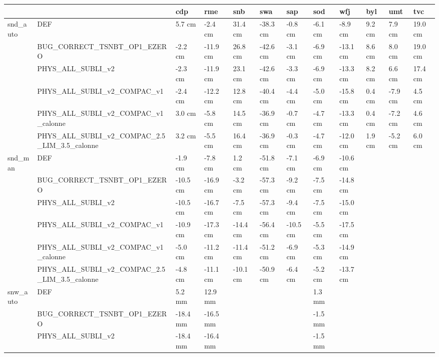 \begin{tabular}{llllllllllll}
\toprule
 &  & cdp & rme & snb & swa & sap & sod & wfj & byl & umt & tvc \\
\midrule
\multirow[t]{6}{*}{snd_auto} & DEF & 5.7 cm & -2.4 cm & 31.4 cm & -38.3 cm & -0.8 cm & -6.1 cm & -8.9 cm & 9.2 cm & 7.9 cm & 19.0 cm \\
 & BUG_CORRECT_TSNBT_OP1_EZERO & -2.2 cm & -11.9 cm & 26.8 cm & -42.6 cm & -3.1 cm & -6.9 cm & -13.1 cm & 8.6 cm & 8.0 cm & 19.0 cm \\
 & PHYS_ALL_SUBLI_v2 & -2.3 cm & -11.9 cm & 23.1 cm & -42.6 cm & -3.3 cm & -6.9 cm & -13.3 cm & 8.2 cm & 6.6 cm & 17.4 cm \\
 & PHYS_ALL_SUBLI_v2_COMPAC_v1 & -2.4 cm & -12.2 cm & 12.8 cm & -40.4 cm & -4.4 cm & -5.0 cm & -15.8 cm & 0.4 cm & -7.9 cm & 4.5 cm \\
 & PHYS_ALL_SUBLI_v2_COMPAC_v1_calonne & 3.0 cm & -5.8 cm & 14.5 cm & -36.9 cm & -0.7 cm & -4.7 cm & -13.3 cm & 0.4 cm & -7.2 cm & 4.6 cm \\
 & PHYS_ALL_SUBLI_v2_COMPAC_2.5_LIM_3.5_calonne & 3.2 cm & -5.5 cm & 16.4 cm & -36.9 cm & -0.3 cm & -4.7 cm & -12.0 cm & 1.9 cm & -5.2 cm & 6.0 cm \\
\cline{1-12}
\multirow[t]{6}{*}{snd_man} & DEF & -1.9 cm & -7.8 cm & 1.2 cm & -51.8 cm & -7.1 cm & -6.9 cm & -10.6 cm &  &  &  \\
 & BUG_CORRECT_TSNBT_OP1_EZERO & -10.5 cm & -16.9 cm & -3.2 cm & -57.3 cm & -9.2 cm & -7.5 cm & -14.8 cm &  &  &  \\
 & PHYS_ALL_SUBLI_v2 & -10.5 cm & -16.7 cm & -7.5 cm & -57.3 cm & -9.4 cm & -7.5 cm & -15.0 cm &  &  &  \\
 & PHYS_ALL_SUBLI_v2_COMPAC_v1 & -10.9 cm & -17.3 cm & -14.4 cm & -56.4 cm & -10.5 cm & -5.5 cm & -17.5 cm &  &  &  \\
 & PHYS_ALL_SUBLI_v2_COMPAC_v1_calonne & -5.0 cm & -11.2 cm & -11.4 cm & -51.2 cm & -6.9 cm & -5.3 cm & -14.9 cm &  &  &  \\
 & PHYS_ALL_SUBLI_v2_COMPAC_2.5_LIM_3.5_calonne & -4.8 cm & -11.1 cm & -10.1 cm & -50.9 cm & -6.4 cm & -5.2 cm & -13.7 cm &  &  &  \\
\cline{1-12}
\multirow[t]{6}{*}{snw_auto} & DEF & 5.2 mm & 12.9 mm &  &  &  & 1.3 mm &  &  &  &  \\
 & BUG_CORRECT_TSNBT_OP1_EZERO & -18.4 mm & -16.5 mm &  &  &  & -1.5 mm &  &  &  &  \\
 & PHYS_ALL_SUBLI_v2 & -18.4 mm & -16.4 mm &  &  &  & -1.5 mm &  &  &  &  \\

\end{tabular}

